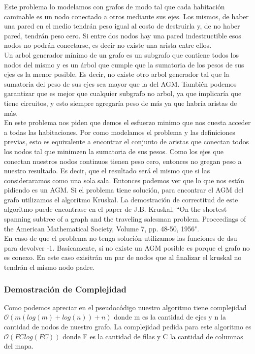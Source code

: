 \documentclass[spanish,12pt]{article}
\begin{document}
Este problema lo modelamos con grafos de modo tal que cada habitación caminable es un nodo conectado a otros mediante sus ejes. Los mismos, de haber una pared en el medio tendrán peso igual al costo de destruirla y, de no haber pared, tendrán peso cero. Si entre dos nodos hay una pared indestructible esos nodos no podrán conectarse, es decir no existe una arista entre ellos.
\\
Un arbol generador mínimo de un grafo es un subgrafo que contiene todos los nodos del mismo y es un árbol  que cumple que la sumatoria de los pesos de sus ejes es la menor posible. Es decir, no existe otro arbol generador tal que la sumatoria del peso de sus ejes sea mayor que la del AGM.
También podemos garantizar que es mejor que cualquier subgrafo no arbol, ya que implicaría que tiene circuitos, y esto siempre agregaría peso de más ya que habría aristas de más.
\\
En este problema nos piden que demos el esfuerzo minimo que nos cuesta acceder a todas las habitaciones. Por como modelamos el problema y las definiciones previas, esto es equivalente a encontrar el conjunto de aristas que conectan todos los nodos tal que minimzen la sumatoria de sus pesos.
Como los ejes que conectan nuestros nodos continuos tienen peso cero, entonces no gregan peso a nuestro resultado. Es decir, que el resultado será el mismo que si las consideraramos como una sola sala.  
 Entonces podemos ver que lo que nos están pidiendo es un AGM. Si el problema tiene solución, para encontrar el AGM del grafo utilizamos el algoritmo Kruskal. La demostración de correctitud de este algoritmo puede encontrase en el paper de  J.B. Kruskal, ``On the shortest spanning subtree of a graph and the traveling salesman problem. Proceedings of the American Mathematical Society, Volume 7, pp. 48-50, 1956".
\\
En caso de que el problema no tenga solución utilizamos las funciones de dsu para devolver -1. Basicamente, si no existe un AGM posible es porque el grafo no es conexo. En este caso exisitrán un par de nodos que al finalizar el kruskal no tendrán el mismo nodo padre. 


\subsubsection{Demostración de Complejidad}


Como podemos apreciar en el pseudocódigo nuestro algoritmo tiene complejidad $\mathcal{O}(m(log(m)+log(n))+n)$ donde m es la cantidad de ejes y n la cantidad de nodos de nuestro grafo.
La complejidad pedida para este algoritmo es $\mathcal{O}(FClog(FC))$ donde F es la cantidad de filas y C la cantidad de columnas del mapa.
\end{document}
